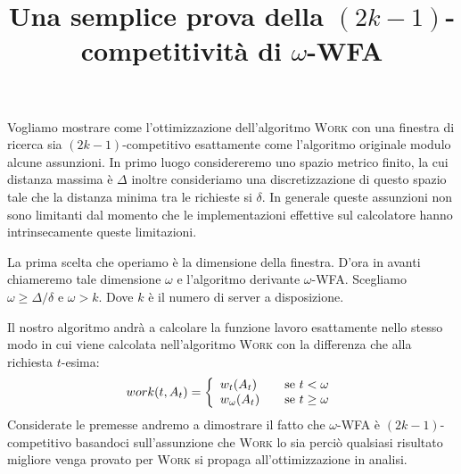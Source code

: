 \documentclass[a4paper, 11pt]{article}
\begin{document}
\title{Una semplice prova della $(2k - 1)$-competitività di $\omega$-WFA}
\maketitle

Vogliamo mostrare come l'ottimizzazione dell'algoritmo \textsc{Work} con una 
finestra di ricerca sia $(2k - 1)$-competitivo esattamente come l'algoritmo 
originale modulo alcune assunzioni. In primo luogo considereremo uno spazio
metrico finito, la cui distanza massima è $\Delta$ inoltre consideriamo una
discretizzazione di questo spazio tale che la distanza minima tra le richieste
si $\delta$. In generale queste assunzioni non sono limitanti dal momento che 
le implementazioni effettive sul calcolatore hanno intrinsecamente queste 
limitazioni.

La prima scelta che operiamo è la dimensione della finestra. D'ora in avanti 
chiameremo tale dimensione $\omega$ e l'algoritmo derivante $\omega$-WFA. 
Scegliamo $\omega \geq \Delta/\delta$ e $\omega > k$. Dove $k$ è il numero di 
server a disposizione. 

Il nostro algoritmo andrà a calcolare la funzione lavoro esattamente nello 
stesso modo in cui viene calcolata nell'algoritmo \textsc{Work} con la 
differenza che alla richiesta $t$-esima:
\[
    work(t, A_t) = 
    \left\{ \begin{array}{l l}
        w_t(A_t) & \quad \text{se } t < \omega\\
        w_\omega(A_t) & \quad \text{se } t \geq \omega \\
    \end{array}\right.
\]
Considerate le premesse andremo a dimostrare il fatto che $\omega$-WFA è 
$(2k - 1)$-competitivo basandoci sull'assunzione che \textsc{Work} lo sia
perciò qualsiasi risultato migliore venga provato per \textsc{Work} si propaga
all'ottimizzazione in analisi.
\end{document}
